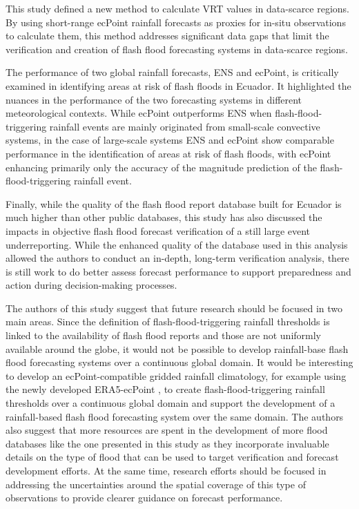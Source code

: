 \documentclass[techmemo]{ecmwfrep}%
\begin{document}
This study defined a new method to calculate VRT values in data-scarce regions. By using short-range ecPoint rainfall forecasts as proxies for in-situ observations to calculate them, this method addresses significant data gaps that limit the verification and creation of flash flood forecasting systems in data-scarce regions. 

The performance of two global rainfall forecasts, ENS and ecPoint, is critically examined in identifying areas at risk of flash floods in Ecuador. It highlighted the nuances in the performance of the two forecasting systems in different meteorological contexts. While ecPoint outperforms ENS when flash-flood-triggering rainfall events are mainly originated from small-scale convective systems, in the case of large-scale systems ENS and ecPoint show comparable performance in the identification of areas at risk of flash floods, with ecPoint enhancing primarily only the accuracy of the magnitude prediction of the flash-flood-triggering rainfall event.

Finally, while the quality of the flash flood report database built for Ecuador is much higher than other public databases, this study has also discussed the impacts in objective flash flood forecast verification of a still large event underreporting. While the enhanced quality of the database used in this analysis allowed the authors to conduct an in-depth, long-term verification analysis, there is still work to do better assess forecast performance to support preparedness and action during decision-making processes.

The authors of this study suggest that future research should be focused in two main areas. Since the definition of flash-flood-triggering rainfall thresholds is linked to the availability of flash flood reports and those are not uniformly available around the globe, it would not be possible to develop rainfall-base flash flood forecasting systems over a continuous global domain. It would be interesting to develop an ecPoint-compatible gridded rainfall climatology, for example using the newly developed ERA5-ecPoint \citep{Hewson2023}, to create flash-flood-triggering rainfall thresholds over a continuous global domain and support the development of a rainfall-based flash flood forecasting system over the same domain. The authors also suggest that more resources are spent in the development of more flood databases like the one presented in this study as they incorporate invaluable details on the type of flood that can be used to target verification and forecast development efforts. At the same time, research efforts should be focused in addressing the uncertainties around the spatial coverage of this type of observations to provide clearer guidance on forecast performance.

 
\end{document}

